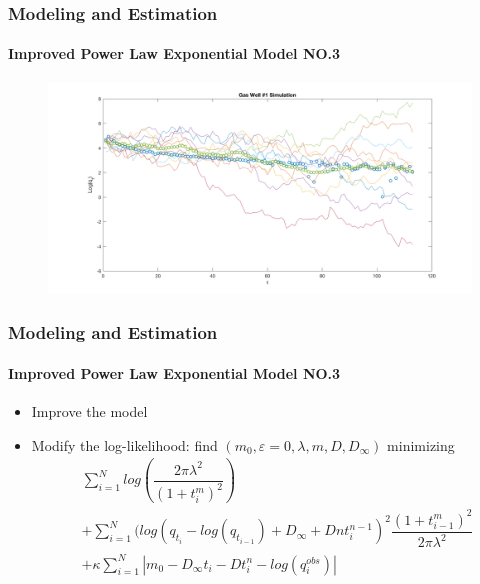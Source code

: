 \documentclass[11pt]{beamer}
\begin{document}
	
\begin{frame}
	\frametitle{Modeling and Estimation}
	\framesubtitle{Improved Power Law Exponential Model NO.3}
	\justifying
	\begin{figure}
		\begin{center}
			\includegraphics[width=1.1\textwidth  ]{intmodel} 			
		\end{center}
	\end{figure}				
\end{frame}	

	
\begin{frame}
	\frametitle{Modeling and Estimation}
	\framesubtitle{Improved Power Law Exponential Model NO.3}
	\justifying
	\begin{itemize}
		\item Improve the model
		\item Modify the log-likelihood: find $(m_0,\varepsilon=0,\lambda,m,D,D_{\infty})$ minimizing
		      \begin{eqnarray*}
		      	& \sum_{i=1}^Nlog(\dfrac{2\pi\lambda^2}{(1+t_i^m)^2})\\
		      	&+\sum_{i=1}^N(log(q_{t_i}-log(q_{t_{i-1}})+D_\infty+Dnt_i^{n-1})^2\dfrac{(1+t^m_{i-1})^2}{2\pi\lambda^2}\\
		      	&+\kappa\sum_{i=1}^N|m_0-D_\infty t_i-Dt_i^n-log(q_i^{obs})|
		      \end{eqnarray*}
	\end{itemize}	
\end{frame}	
\end{document}
